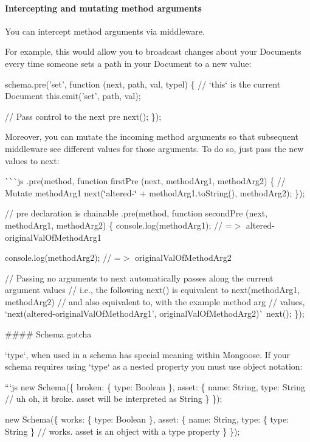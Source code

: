 \paragraph*{Intercepting and mutating method arguments}

You can intercept method arguments via middleware.

For example, this would allow you to broadcast changes about your Documents every time someone {\ttfamily set}s a path in your Document to a new value\+:


\begin{DoxyCode}
schema.pre('set', function (next, path, val, typel) \{
  // `this` is the current Document
  this.emit('set', path, val);

  // Pass control to the next pre
  next();
\});
\end{DoxyCode}


Moreover, you can mutate the incoming {\ttfamily method} arguments so that subsequent middleware see different values for those arguments. To do so, just pass the new values to {\ttfamily next}\+:

\`{}\`{}\`{}js .pre(method, function first\+Pre (next, method\+Arg1, method\+Arg2) \{ // Mutate method\+Arg1 next(\char`\"{}altered-\/\char`\"{} + method\+Arg1.\+to\+String(), method\+Arg2); \});

// pre declaration is chainable .pre(method, function second\+Pre (next, method\+Arg1, method\+Arg2) \{ console.\+log(method\+Arg1); // =$>$ \textquotesingle{}altered-\/original\+Val\+Of\+Method\+Arg1\textquotesingle{}

console.\+log(method\+Arg2); // =$>$ \textquotesingle{}original\+Val\+Of\+Method\+Arg2\textquotesingle{}

// Passing no arguments to {\ttfamily next} automatically passes along the current argument values // i.\+e., the following {\ttfamily next()} is equivalent to {\ttfamily next(method\+Arg1, method\+Arg2)} // and also equivalent to, with the example method arg // values, `next(\textquotesingle{}altered-\/original\+Val\+Of\+Method\+Arg1', \textquotesingle{}original\+Val\+Of\+Method\+Arg2\textquotesingle{})\`{} next(); \}); 
\begin{DoxyCode}
#### Schema gotcha

`type`, when used in a schema has special meaning within Mongoose. If your schema requires using `type` as
       a nested property you must use object notation:

```js
new Schema(\{
  broken: \{ type: Boolean \},
  asset: \{
    name: String,
    type: String // uh oh, it broke. asset will be interpreted as String
  \}
\});

new Schema(\{
  works: \{ type: Boolean \},
  asset: \{
    name: String,
    type: \{ type: String \} // works. asset is an object with a type property
  \}
\});
\end{DoxyCode}


